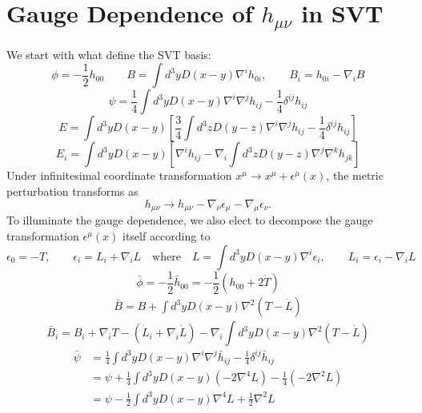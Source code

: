 \documentclass[10pt,letterpaper]{article}
\numberwithin{equation}{subsection}
\begin{document}
\section{Gauge Dependence of $h_{\mu\nu}$ in SVT}
We start with what define the SVT basis:
\begin{equation}
\phi = -\frac12 h_{00}\qquad B = \int d^3y D(x-y) \nabla^i h_{0i},\qquad B_i = h_{0i} - \nabla_i B
\end{equation}
\begin{equation}
\psi = \frac14 \int d^3y D(x-y) \nabla^i \nabla^j h_{ij} - \frac14 \delta^{ij} h_{ij}
\end{equation}
\begin{equation}
E = \int d^3y D(x-y)\left[ \frac34 \int d^3z D(y-z)\nabla^i \nabla^j h_{ij} - \frac14 \delta^{ij} h_{ij}\right]
\end{equation}
\begin{equation}
E_i = \int d^3y D(x-y)\left[ \nabla^i h_{ij} - \nabla_i\int d^3z D(y-z)\nabla^j \nabla^k h_{jk}\right]
\end{equation}
Under infinitesimal coordinate transformation $x^\mu \to x^\mu + \epsilon^\mu (x)$, the metric perturbation transforms as
\begin{equation}
h_{\mu\nu} \to h_{\mu\nu} - \nabla_\nu \epsilon_\mu - \nabla_\mu \epsilon_\nu.
\end{equation}
To illuminate the gauge dependence, we also elect to decompose the gauge transformation $\epsilon^\mu(x)$ itself according to
\begin{equation}
\epsilon_0 = -T,\qquad \epsilon_i = L_i + \nabla_i L\quad \text{where}\quad  L = \int d^3y D(x-y) \nabla^i \epsilon_i,\qquad 
L_i = \epsilon_i - \nabla_i L
\end{equation}
\begin{equation}
\bar\phi = -\frac12 \bar h_{00} = -\frac12 \left( h_{00}+2\dot T\right)
\end{equation}
\begin{align}
\bar B = B +  \int d^3y D(x-y) \nabla^2 (T-\dot L)
\end{align}
\begin{equation}
\bar B_i = B_i + \nabla_i T - (\dot L_i + \nabla_i \dot L) - \nabla_i  \int d^3y D(x-y) \nabla^2 (T-\dot L)
\end{equation}
\begin{align}
\bar \psi &=  \frac14 \int d^3y D(x-y) \nabla^i \nabla^j \bar h_{ij} - \frac14 \delta^{ij} \bar h_{ij}\\
&= \psi +\frac14 \int d^3y D(x-y) (-2 \nabla^4 L) - \frac14 (-2\nabla^2 L)\\
&= \psi -\frac12 \int d^3y D(x-y) \nabla^4 L + \frac12 \nabla^2 L
\end{align}
\end{document}
